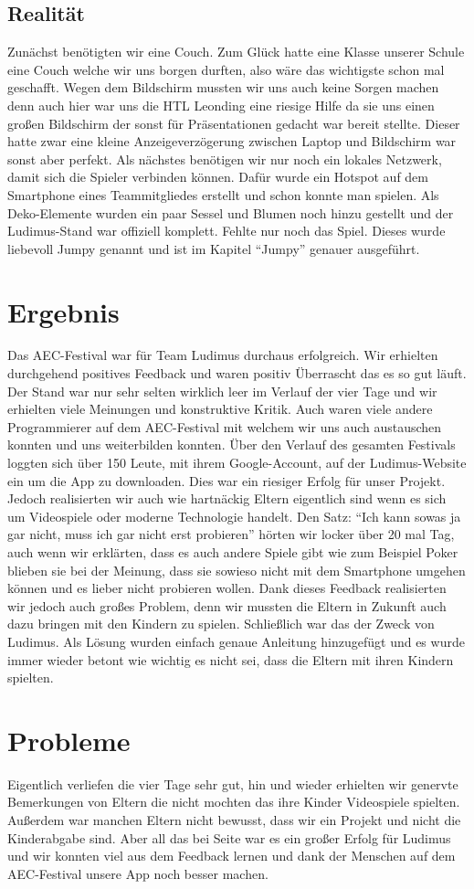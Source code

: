 \subsection{Realität}
Zunächst benötigten wir eine Couch. Zum Glück hatte eine Klasse unserer Schule eine Couch welche wir uns borgen durften, also wäre das wichtigste schon mal geschafft. Wegen dem Bildschirm mussten wir uns auch keine Sorgen machen denn auch hier war uns die HTL Leonding eine riesige Hilfe da sie uns einen großen Bildschirm der sonst für Präsentationen gedacht war bereit stellte. Dieser hatte zwar eine kleine Anzeigeverzögerung zwischen Laptop und Bildschirm war sonst aber perfekt. Als nächstes benötigen wir nur noch ein lokales Netzwerk, damit sich die Spieler verbinden können. Dafür wurde ein Hotspot auf dem Smartphone eines Teammitgliedes erstellt und schon konnte man spielen. Als Deko-Elemente wurden ein paar Sessel und Blumen noch hinzu gestellt und der Ludimus-Stand war offiziell komplett. Fehlte nur noch das Spiel. Dieses wurde liebevoll Jumpy genannt und ist im Kapitel “Jumpy” genauer ausgeführt.
\section{Ergebnis}
Das AEC-Festival war für Team Ludimus durchaus erfolgreich. Wir erhielten durchgehend positives Feedback und waren positiv Überrascht das es so gut läuft. Der Stand war nur sehr selten wirklich leer im Verlauf der vier Tage und wir erhielten viele Meinungen und konstruktive Kritik. Auch waren viele andere Programmierer auf dem AEC-Festival mit welchem wir uns auch austauschen konnten und uns weiterbilden konnten. Über den Verlauf des gesamten Festivals loggten sich über 150 Leute, mit ihrem Google-Account, auf der Ludimus-Website ein um die App zu downloaden. Dies war ein riesiger Erfolg für unser Projekt. Jedoch realisierten wir auch wie hartnäckig Eltern eigentlich sind wenn es sich um Videospiele oder moderne Technologie handelt. Den Satz: “Ich kann sowas ja gar nicht, muss ich gar nicht erst probieren” hörten wir locker über 20 mal Tag, auch wenn wir erklärten, dass es auch andere Spiele gibt wie zum Beispiel Poker blieben sie bei der Meinung, dass sie sowieso nicht mit dem Smartphone umgehen können und es lieber nicht probieren wollen. Dank dieses Feedback realisierten wir jedoch auch großes Problem, denn wir mussten die Eltern in Zukunft auch dazu bringen mit den Kindern zu spielen. Schließlich war das der Zweck von Ludimus. Als Lösung wurden einfach genaue Anleitung hinzugefügt und es wurde immer wieder betont wie wichtig es nicht sei, dass die Eltern mit ihren Kindern spielten.
\section{Probleme}
Eigentlich verliefen die vier Tage sehr gut, hin und wieder erhielten wir genervte Bemerkungen von Eltern die nicht mochten das ihre Kinder Videospiele spielten. Außerdem war manchen Eltern nicht bewusst, dass wir ein Projekt und nicht die Kinderabgabe sind. Aber all das bei Seite war es ein großer Erfolg für Ludimus und wir konnten viel aus dem Feedback lernen und dank der Menschen auf dem AEC-Festival unsere App noch besser machen.
